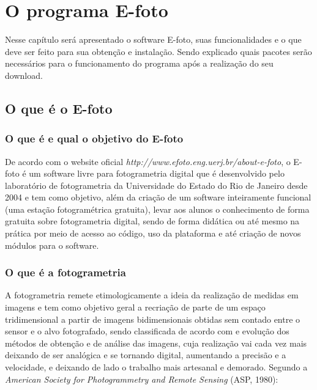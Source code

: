 \chapter{O programa E-foto}

Nesse capítulo será apresentado o software E-foto, suas funcionalidades e o que deve ser feito para sua obtenção e instalação. Sendo explicado quais pacotes serão necessários para o funcionamento do programa após a realização do seu download.

\section{O que é o E-foto}
\subsection{O que é e qual o objetivo do E-foto}
De acordo com o website oficial \textit{http://www.efoto.eng.uerj.br/about-e-foto}, o E-foto é um software livre para fotogrametria digital que é desenvolvido pelo laboratório de fotogrametria da Universidade do Estado do Rio de Janeiro desde 2004 e tem como objetivo, além da criação de um software inteiramente funcional (uma estação fotogramétrica gratuita), levar aos alunos o conhecimento de forma gratuita sobre fotogrametria digital, sendo de forma didática ou até mesmo na prática por meio de acesso ao código, uso da plataforma e até criação de novos módulos para o software.

\subsection{O que é a fotogrametria}
A fotogrametria remete etimologicamente a ideia da realização de medidas em imagens e tem como objetivo geral a recriação de parte de um espaço tridimensional a partir de imagens bidimensionais obtidas sem contado entre o sensor e o alvo fotografado, sendo classificada de acordo com e evolução dos métodos de obtenção e de análise das imagens, cuja realização vai cada vez mais deixando de ser analógica e se tornando digital, aumentando a precisão e a velocidade, e deixando de lado o trabalho mais artesanal e demorado.
Segundo a \textit{American Society for Photogrammetry and Remote Sensing} (ASP, 1980):

